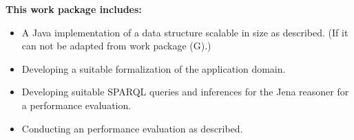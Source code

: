 \documentclass[
	english,
	accentcolor=9c,%
  marginpar=0cm %
	]{tudapub}
\begin{document}
\begin{description}
    \textbf{This work package includes:}
    \begin{itemize}
      \item A Java implementation of a data structure scalable in size as
        described. (If it can not be adapted from work package (G).)
      \item Developing a suitable formalization of the application domain. %
      \item Developing suitable SPARQL queries and inferences for the Jena
        reasoner for a performance evaluation.
      \item Conducting an performance evaluation as described.
    \end{itemize}
\end{description}
\end{document}
